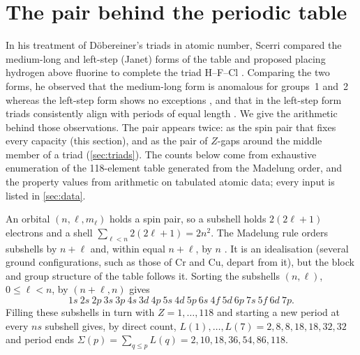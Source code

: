 \documentclass[11pt]{article}
\theoremstyle{definition}\newtheorem{definition}[theorem]{Definition}
\theoremstyle{remark}\newtheorem{remark}[theorem]{Remark}
\begin{document}
\section{The pair behind the periodic table}\label{sec:pair}
In his treatment of D\"obereiner's triads \cite{Dob1829} in atomic number, Scerri compared the medium-long and left-step (Janet) forms of the table and proposed placing hydrogen above fluorine to complete the triad H--F--Cl \cite{Scerri2008,Scerri2010,Scerri2022}. Comparing the two forms, he observed that the medium-long form is anomalous for groups~1 and~2 whereas the left-step form shows no exceptions \cite{Scerri2010}, and that in the left-step form triads consistently align with periods of equal length \cite{Scerri2022}. We give the arithmetic behind those observations. The pair appears twice: as the spin pair that fixes every capacity (this section), and as the pair of $Z$-gaps around the middle member of a triad (\cref{sec:triads}). The counts below come from exhaustive enumeration of the 118-element table generated from the Madelung order, and the property values from arithmetic on tabulated atomic data; every input is listed in \cref{sec:data}.

An orbital $(n,\ell,m_\ell)$ holds a spin pair, so a subshell holds $2(2\ell+1)$ electrons and a shell $\sum_{\ell<n}2(2\ell+1)=2n^2$. The Madelung rule orders subshells by $n+\ell$ and, within equal $n+\ell$, by $n$ \cite{AllenKnight}. It is an idealisation (several ground configurations, such as those of Cr and Cu, depart from it), but the block and group structure of the table follows it. Sorting the subshells $(n,\ell)$, $0\le\ell<n$, by $(n+\ell,n)$ gives
\[
1s\ 2s\ 2p\ 3s\ 3p\ 4s\ 3d\ 4p\ 5s\ 4d\ 5p\ 6s\ 4f\ 5d\ 6p\ 7s\ 5f\ 6d\ 7p .
\]
Filling these subshells in turn with $Z=1,\dots,118$ and starting a new period at every $ns$ subshell gives, by direct count, $L(1),\dots,L(7)=2,8,8,18,18,32,32$ and period ends $\Sigma(p)=\sum_{q\le p}L(q)=2,10,18,36,54,86,118$.
\end{document}
